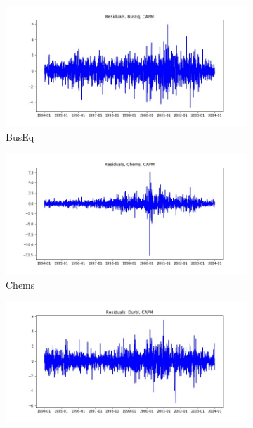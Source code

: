 \documentclass{article}
\begin{document}
\begin{figure}
  \begin{subfigure}[b]{0.5\textwidth}
    \centering
    \includegraphics[width=\textwidth]{BusEq/resid_ts_CAPM.jpg}
    \caption{BusEq}
    \label{fig:1}
  \end{subfigure}
  \begin{subfigure}[b]{0.5\textwidth}
    \centering
    \includegraphics[width=\textwidth]{Chems/resid_ts_CAPM.jpg}
    \caption{Chems}
    \label{fig:2}
  \end{subfigure}
  \begin{subfigure}[b]{0.5\textwidth}
    \centering
    \includegraphics[width=\textwidth]{Durbl/resid_ts_CAPM.jpg}

\end{subfigure}
\end{figure}
\end{document}
